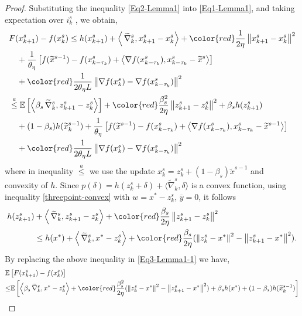 \documentclass[10pt, conference, compsocconf]{IEEEtran}
\newcommand*{\E}{\mathbb{E}}
\newcommand*{\VRG}{\,\widetilde{\nabla}_k^s}
\newcommand{\norm}[1]{\left\lVert#1\right\rVert}
\newcommand{\Iprod}[2]{\left\langle #1,#2\right\rangle}
\theoremstyle{definition}
\theoremstyle{remark}
\begin{document}
\begin{proof}
Substituting the inequality \eqref{Eq2-Lemma1} into \eqref{Eq1-Lemma1}, and taking expectation over $i ^s_k$ , we obtain,
\begin{equation}\label{Eq3-Lemma1-1}
\begin{split}
&F(x_{k+1}^s) -f(x_{k}^s)\leq h(x_{k+1}^s)+ \Iprod{\VRG}{x_{k+1}^s-x_{k}^s}+{\color{red}\frac{1}{2\eta}}\norm{x_{k+1}^s-x_{k}^s}^2\\
&~~~+\frac{1}{\theta_{\eta}}\left[f(\widetilde{x}^{s-1})-f(x_{k-\tau_k}^s)+\Iprod{\nabla f(x_{k-\tau_k}^s)}{x_{k-\tau_k}^s-\widetilde{x}^s}\right]\\&
~~~+{\color{red}\frac{1}{2 \theta_{\eta} L} \norm{\nabla f(x_{k}^s)-\nabla f(x_{k-\tau_k}^s)}^2}\\
&\stackrel{a}{\leq}\E\left[\Iprod{\beta_s\VRG}{z_{k+1}^s-z_{k}^s}\right]+{\color{red}\frac{ \beta_s^2}{2\eta}}\norm{z_{k+1}^s-z_{k}^s}^2+\beta_s h(z_{k+1}^s)\\
&~~~+(1-\beta_s) h(\widetilde{x}_k^{s-1})+\frac{1}{\theta_{\eta}}\left[f(\widetilde{x}^{s-1})-f(x_{k-\tau_k}^s)+\Iprod{\nabla f(x_{k-\tau_k}^s)}{x_{k-\tau_k}^s-\widetilde{x}^{s-1}}\right]\\
&~~~+{\color{red}\frac{1}{2 \theta_{\eta} L} \norm{\nabla f(x_{k}^s)-\nabla f(x_{k-\tau_k}^s)}^2}
\end{split}
\end{equation}
where in inequality $\stackrel{a}{\leq}$ we use the update $x_k^s = z_k^s+(1-\beta_s)\widetilde{x}^{s-1}$ and convexity of $h$. Since   $p(\delta) = h(z_k^s+\delta)+\langle\widetilde{\nabla}_k^s,\delta\rangle$ is a convex function, using inequality \eqref{threepoint-convex} with $w=x^*-z_{k}^s$, $\overline{y} = 0$, it follows
\begin{equation}
\begin{split}
h(z_{k+1}^s) &+ \Iprod{\VRG}{z_{k+1}^s-z_{k}^s}+{\color{red}\frac{\beta_s}{2\eta}}\norm{z_{k+1}^s-z_{k}^s}^2  \\
&\leq h(x^*)+\Iprod{\VRG}{x^* - z_{k}^s}+{\color{red}\frac{\beta_s}{2\eta}}(\norm{z_{k}^s-x^*}^2-\norm{z_{k+1}^s-x^*}^2). \\ 
\end{split}
\end{equation}
By replacing the above inequality in \eqref{Eq3-Lemma1-1} we have,
\begin{equation}\label{Eq3-Lemma1I}
\begin{split}
&\E\left[F(x_{k+1}^s) -f(x_{k}^s)\right]\\
&{\leq}\E\left[\Iprod{\beta_s\VRG}{x^* - z_{k}^s}+{\color{red}\frac{\beta_s^2}{2\eta}}(\norm{z_{k}^s-x^*}^2-\norm{z_{k+1}^s-x^*}^2)+\beta_s h(x^*)+(1-\beta_s) h(\widetilde{x}_k^{s-1})\right]\\

\end{split}
\end{equation}
\end{proof}
\end{document}
